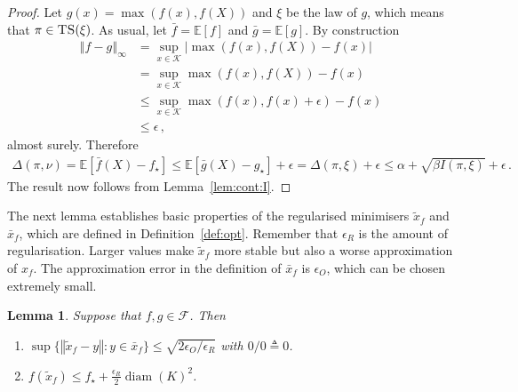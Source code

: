\documentclass[letter, 12pt]{report}
\newcommand{\epsR}{{\epsilon_R}}
\newcommand{\epsO}{{\epsilon_O}}
\newcommand{\norm}[1]{\left \Vert  #1 \right \Vert}
\newcommand{\E}{\mathbb E}
\newcommand{\cK}{\mathcal K}
\newcommand{\sF}{\mathscr F}
\newcommand{\diam}{\operatorname{diam}}
\newcommand{\1}{\mathbf{1}}
\newcommand{\ts}{\textsc{TS}\xspace}
\theoremstyle{plain}
\newtheorem{lemma}[theorem]{Lemma}
\theoremstyle{definition}
\theoremstyle{remark}
\begin{document}
\begin{proof}
    Let $g(x) = \max(f(x), f(X))$ and $\xi$ be the law of $g$, which means that $\pi \in \ts(\xi)$. %
    As usual, let $\bar f = \E[f]$ and $\bar g = \E[g]$.
    By construction
    \begin{align*}
        \norm{f - g}_\infty
         & =
        \sup_{x \in \cK} |\max(f(x), f(X)) - f(x)|          \\
         & =
        \sup_{x \in \cK} \max(f(x), f(X)) - f(x)            \\
         & \leq
        \sup_{x \in \cK} \max(f(x), f(x) + \epsilon) - f(x) \\
         & \leq \epsilon\,,
    \end{align*}
    almost surely.
    Therefore
    \begin{align*}
        \Delta(\pi, \nu)
        = \E[\bar f(X) - f_\star]
        \leq \E[\bar g(X) - g_\star] + \epsilon
        = \Delta(\pi, \xi) + \epsilon
        \leq \alpha + \sqrt{\beta I(\pi, \xi)} + \epsilon \,.
    \end{align*}
    The result now follows from Lemma~\ref{lem:cont:I}.
\end{proof}

The next lemma establishes basic properties of the regularised minimisers $\tilde x_f$ and $\bar x_f$, which are defined
in Definition~\ref{def:opt}.
Remember that $\epsR$ is the amount of regularisation. Larger values make $\tilde x_f$ more stable but also a worse approximation of $x_f$.
The approximation error in the definition of $\bar x_f$ is $\epsO$, which can be chosen extremely small.

\begin{lemma}\label{lem:sc}
    Suppose that $f, g \in \sF$.
    Then
    \begin{enumerate}
        \item $\sup \{\norm{\tilde x_f - y} : y \in \bar x_f\} \leq \sqrt{2\epsO / \epsR}$ with $0/0 \triangleq 0$. \label{lem:sc:approx-close}
        \item $f(\tilde x_f) \leq f_\star + \frac{\epsR}{2} \diam(K)^2$. \label{lem:sc:min}
    \end{enumerate}
\end{lemma}
\end{document}
